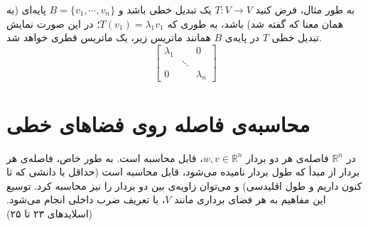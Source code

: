 به طور مثال، فرض کنید $T:V\xrightarrow{}V$ یک تبدیل خطی باشد و $B = \{v_{1}, \cdots, v_{n}\}$ پایه‌ای (به همان معنا که گفته شد) باشد، به طوری که $T(v_{1}) = \lambda_{1}v_{1}$؛ در این صورت نمایش تبدیل خطی $T$ در پایه‌‌ی $B$ همانند ماتریس زیر، یک ماتریس قطری خواهد شد.
\begin{equation*}
\begin{bmatrix}
\lambda_{1} &&0\\
&\ddots&\\
0 && \lambda_{n}
\end{bmatrix}
\end{equation*}

\section{محاسبه‌ی فاصله روی فضا‌های خطی}
در $\mathbb{R}^n$ فاصله‌ی هر دو بردار $w,v \in \mathbb{R}^n$، قابل محاسبه‌ است. به طور خاص، فاصله‌ی هر بردار از مبدأ که طول بردار نامیده می‌شود، قابل محاسبه است (حداقل با دانشی که تا کنون داریم و طول اقلیدسی) و می‌توان زاویه‌ی بین دو بردار را نیز محاسبه کرد. توسیع این مفاهیم به هر فضا‌ی برداری مانند $V$، با تعریف ضرب داخلی انجام می‌شود. (اسلاید‌های ۲۳ تا ۲۵)











